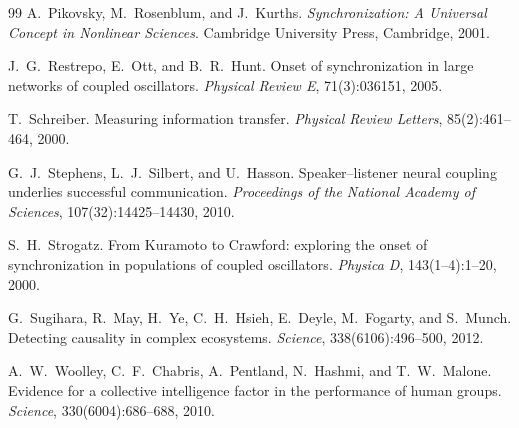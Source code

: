 \documentclass[11pt]{article}
\begin{document}
\begin{thebibliography}{99}
A.~Pikovsky, M.~Rosenblum, and J.~Kurths.
\newblock \emph{Synchronization: A Universal Concept in Nonlinear Sciences}.
\newblock Cambridge University Press, Cambridge, 2001.

J.~G.~Restrepo, E.~Ott, and B.~R.~Hunt.
\newblock Onset of synchronization in large networks of coupled oscillators.
\newblock \emph{Physical Review E}, 71(3):036151, 2005.

T.~Schreiber.
\newblock Measuring information transfer.
\newblock \emph{Physical Review Letters}, 85(2):461--464, 2000.

G.~J.~Stephens, L.~J.~Silbert, and U.~Hasson.
\newblock Speaker--listener neural coupling underlies successful communication.
\newblock \emph{Proceedings of the National Academy of Sciences}, 107(32):14425--14430, 2010.

S.~H.~Strogatz.
\newblock From Kuramoto to Crawford: exploring the onset of synchronization in populations of coupled oscillators.
\newblock \emph{Physica D}, 143(1--4):1--20, 2000.

G.~Sugihara, R.~May, H.~Ye, C.~H.~Hsieh, E.~Deyle, M.~Fogarty, and S.~Munch.
\newblock Detecting causality in complex ecosystems.
\newblock \emph{Science}, 338(6106):496--500, 2012.

A.~W.~Woolley, C.~F.~Chabris, A.~Pentland, N.~Hashmi, and T.~W.~Malone.
\newblock Evidence for a collective intelligence factor in the performance of human groups.
\newblock \emph{Science}, 330(6004):686--688, 2010.

\end{thebibliography}
\end{document}
